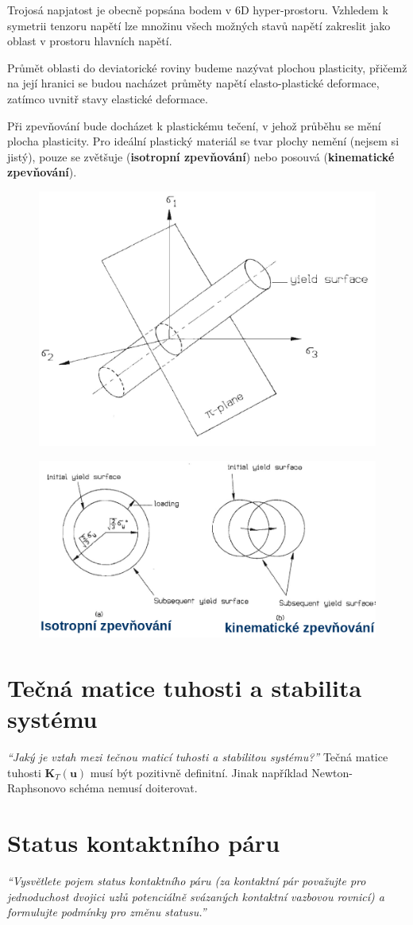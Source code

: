 \documentclass{article}
\begin{document}
	Trojosá napjatost je obecně popsána bodem v 6D hyper-prostoru. Vzhledem k symetrii tenzoru napětí lze množinu všech možných stavů napětí zakreslit jako oblast v prostoru hlavních napětí.

	Průmět oblasti do deviatorické roviny budeme nazývat plochou plasticity, přičemž na její hranici se budou nacházet průměty napětí elasto-plastické deformace, zatímco uvnitř stavy elastické deformace.

	Při zpevňování bude docházet k plastickému tečení, v jehož průběhu se mění plocha plasticity. Pro ideální plastický materiál se tvar plochy nemění (nejsem si jistý), pouze se zvětšuje (\textbf{isotropní zpevňování}) nebo posouvá (\textbf{kinematické zpevňování}).
	\begin{figure}[h!]
		\centering
		\includegraphics[width=.5\linewidth]{figs/PlochaPlasticity.png}
	\end{figure}
	\begin{figure}[h!]
		\centering
		\includegraphics[width=.5\linewidth]{figs/Zpevnovani.png}
	\end{figure}

	\section{Tečná matice tuhosti a stabilita systému}
	\emph{``Jaký je vztah mezi tečnou maticí tuhosti a stabilitou systému?''}
	Tečná matice tuhosti $\bm{K}_T(\bm{u})$ musí být pozitivně definitní. Jinak například Newton-Raphsonovo schéma nemusí doiterovat.

	\section{Status kontaktního páru}
	\emph{``Vysvětlete pojem status kontaktního páru (za kontaktní pár považujte pro jednoduchost dvojici uzlů potenciálně svázaných kontaktní vazbovou rovnicí) a formulujte podmínky pro změnu statusu.''}
\end{document}
